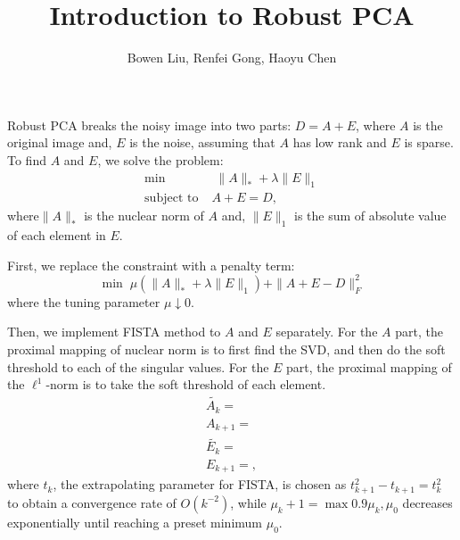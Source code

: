 \documentclass[10pt]{article}
\title{Introduction to Robust PCA}
\author{Bowen Liu, Renfei Gong, Haoyu Chen}
\begin{document}
\maketitle
Robust PCA breaks the noisy image into two parts: $D=A+E$, where $A$ is the original image and, $E$ is the noise, assuming that $A$ has low rank and $E$ is sparse. To find $A$ and $E$, we solve the problem:
\begin{align*}
\min & \; \| A \| _ \ast + \lambda \| E \|_1  \\
 \textrm{subject to} \; & A+E=D,
\end{align*}
where$\| A \| _ \ast$ is the nuclear norm of $A$ and, $\|E\|_1$ is the sum of absolute value of each element in $E$.

First, we replace the constraint with a penalty term:
\[
\min \; \mu \left( \| A \| _ \ast + \lambda \| E \|_1 \right) + \| A+E-D \|_F^2
\]
where the tuning parameter $\mu \downarrow 0$.

Then, we implement FISTA method to $A$ and $E$ separately. For the $A$ part, the proximal mapping of nuclear norm is to first find the SVD, and then do the soft threshold to each of the singular values. For the $E$ part, the proximal mapping of the $\ell^1$-norm is to take the soft threshold of each element.
\begin{align*}
\tilde{A_k} =  \\
A_{k+1} =  \\
\tilde{E_k} =  \\
E_{k+1} = ,
\end{align*}
where $t_k$, the extrapolating parameter for FISTA, is chosen as $t_{k+1}^2 - t_{k+1} = t_k^2$ to obtain a convergence rate of $O(k^{-2})$, while $\mu_k+1 = \max{0.9\mu_k , \mu_0}$ decreases exponentially until reaching a preset minimum $\mu_0$.
\end{document}
